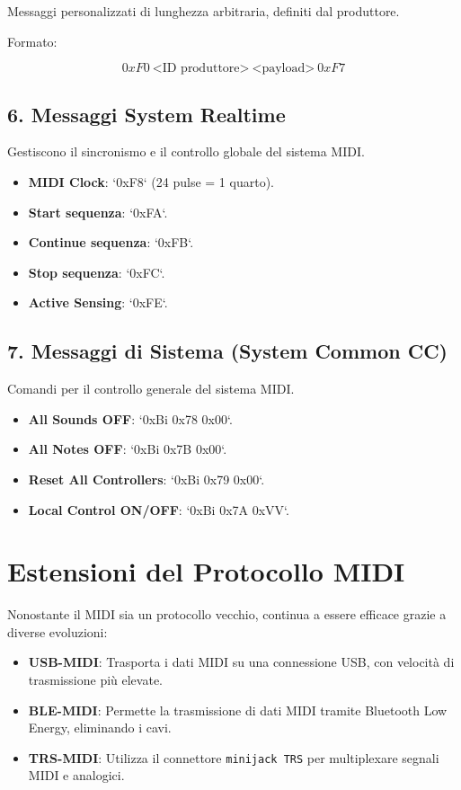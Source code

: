 Messaggi personalizzati di lunghezza arbitraria, definiti dal produttore.

Formato:

\[
0xF0 \ \text{<ID produttore>} \ \text{<payload>} \ 0xF7
\]

\subsection*{6. Messaggi System Realtime}

Gestiscono il sincronismo e il controllo globale del sistema MIDI.

\begin{itemize}
    \item \textbf{MIDI Clock}: `0xF8` (24 pulse = 1 quarto).
    \item \textbf{Start sequenza}: `0xFA`.
    \item \textbf{Continue sequenza}: `0xFB`.
    \item \textbf{Stop sequenza}: `0xFC`.
    \item \textbf{Active Sensing}: `0xFE`.
\end{itemize}

\subsection*{7. Messaggi di Sistema (System Common CC)}

Comandi per il controllo generale del sistema MIDI.

\begin{itemize}
    \item \textbf{All Sounds OFF}: `0xBi 0x78 0x00`.
    \item \textbf{All Notes OFF}: `0xBi 0x7B 0x00`.
    \item \textbf{Reset All Controllers}: `0xBi 0x79 0x00`.
    \item \textbf{Local Control ON/OFF}: `0xBi 0x7A 0xVV`.
\end{itemize}

\section*{Estensioni del Protocollo MIDI}

Nonostante il MIDI sia un protocollo vecchio, continua a essere efficace grazie a diverse evoluzioni:

\begin{itemize}
    \item \textbf{USB-MIDI}: Trasporta i dati MIDI su una connessione USB, con velocità di trasmissione più elevate.
    \item \textbf{BLE-MIDI}: Permette la trasmissione di dati MIDI tramite Bluetooth Low Energy, eliminando i cavi.
    \item \textbf{TRS-MIDI}: Utilizza il connettore \texttt{minijack TRS} per multiplexare segnali MIDI e analogici.
\end{itemize}

